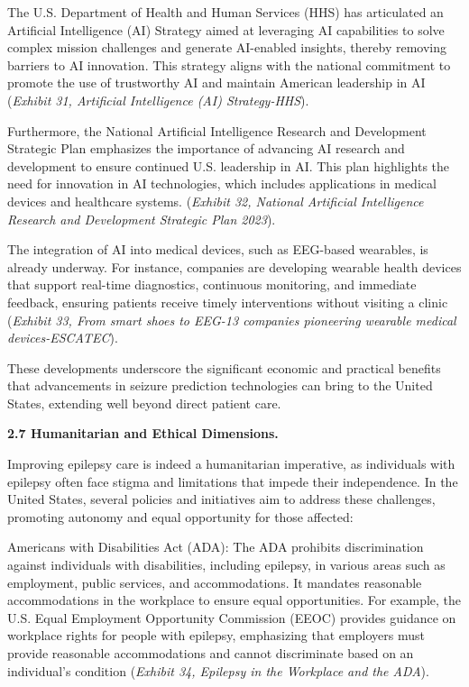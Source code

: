\documentclass{article}
\begin{document}
The U.S. Department of Health and Human Services (HHS) has articulated an Artificial Intelligence (AI) Strategy aimed at leveraging AI capabilities to solve complex mission challenges and generate AI-enabled insights, thereby removing barriers to AI innovation. This strategy aligns with the national commitment to promote the use of trustworthy AI and maintain American leadership in AI  ({\it Exhibit 31, Artificial Intelligence (AI) Strategy-HHS}).

Furthermore, the National Artificial Intelligence Research and Development Strategic Plan emphasizes the importance of advancing AI research and development to ensure continued U.S. leadership in AI. This plan highlights the need for innovation in AI technologies, which includes applications in medical devices and healthcare systems. ({\it Exhibit 32, National Artificial Intelligence Research and Development Strategic Plan 2023}).

The integration of AI into medical devices, such as EEG-based wearables, is already underway. For instance, companies are developing wearable health devices that support real-time diagnostics, continuous monitoring, and immediate feedback, ensuring patients receive timely interventions without visiting a clinic ({\it Exhibit 33, From smart shoes to EEG-13 companies pioneering wearable medical devices-ESCATEC}).

These developments underscore the significant economic and practical benefits that advancements in seizure prediction technologies can bring to the United States, extending well beyond direct patient care.

{\bf 2.7 Humanitarian and Ethical Dimensions. }

Improving epilepsy care is indeed a humanitarian imperative, as individuals with epilepsy often face stigma and limitations that impede their independence. In the United States, several policies and initiatives aim to address these challenges, promoting autonomy and equal opportunity for those affected:

Americans with Disabilities Act (ADA): The ADA prohibits discrimination against individuals with disabilities, including epilepsy, in various areas such as employment, public services, and accommodations. It mandates reasonable accommodations in the workplace to ensure equal opportunities. For example, the U.S. Equal Employment Opportunity Commission (EEOC) provides guidance on workplace rights for people with epilepsy, emphasizing that employers must provide reasonable accommodations and cannot discriminate based on an individual's condition ({\it Exhibit 34, Epilepsy in the Workplace and the ADA}).
\end{document}
